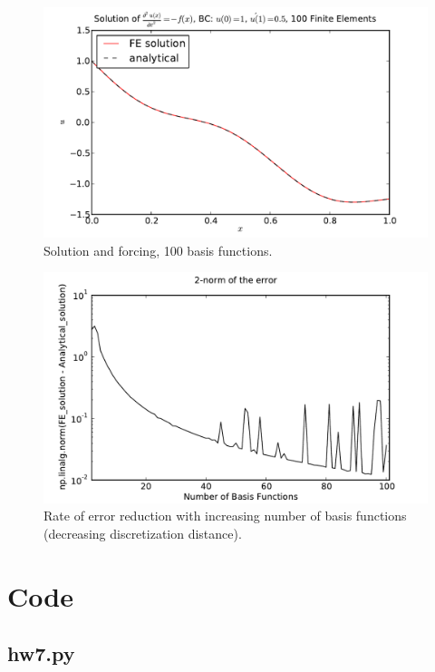 \documentclass[10pt]{article}
\newcommand{\code}[2]{
    \subsection*{#1}
    
    \vspace{2em}
}
\begin{document}
\begin{figure}[ht]
    \centering
    \includegraphics[width=\columnwidth,keepaspectratio=true]{./hw7-solution_and_forcing-N100.pdf}
    \caption{Solution and forcing, 100 basis functions.}
    \label{fig:sf100}
\end{figure}

\begin{figure}[ht]
    \centering
    \includegraphics[width=\columnwidth,keepaspectratio=true]{./hw7-error_rate.pdf}
    \caption{Rate of error reduction with increasing number of basis functions (decreasing discretization distance).}
    \label{fig:errorrate}
\end{figure}

\clearpage

\section{Code}
\label{sec:code}

\code{hw7.py}{hw7.py}
\end{document}
